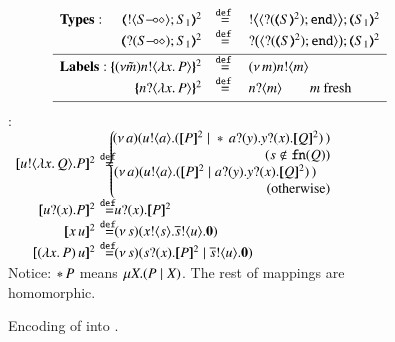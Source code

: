 \begin{figure}[t]
\[
\begin{array}{l}
	\begin{array}{rcl}
\noindent{\bf Types:}\hspace{0.5cm} 
		\tmap{\btout{\lhot{S}}S_1}{2} & \defeq & \bbtout{\chtype{\btinp{\tmap{S}{2}}\tinact}}\tmap{S_1}{2} \\
		\tmap{\btinp{\lhot{S}}S_1}{2} & \defeq & \bbtinp{\chtype{\btinp{\tmap{S}{2}}\tinact}}\tmap{S_1}{2} 
\\[1mm]
\hline
\noindent{\bf Labels:}\ 
		\mapa{(\nu \tilde{m})\bactout{n}{\abs{ x}{P}} }^2  & \defeq & \news{m} \bactout{n}{m} \\
		\mapa{\bactinp{n}{\abs{ x}{P}} }^2 &  \defeq & \bactinp{n}{m}
\quad \quad m \text{ fresh}
\\[1mm]
\hline
\end{array}
\end{array}
\]
\hspace{4mm}{\bf Terms} :\\
\noi$
\begin{array}{rcll}
		\pmap{\bout{u}{\abs{x}{Q}} P}{2} &\!\!\!\! \defeq \!\!\!\!\!\!\!\!&\!\!\!  \left\{
		\begin{array}{r}
		\!\!\!\!	\newsp{a}{\bout{u}{a} (\pmap{P}{2} \Par \repl{} \binp{a}{y} \binp{y}{x} \pmap{Q}{2})\,}\\
                  (s \notin \fn{Q}) \\
		\!\!\!\!	\newsp{a}{\bout{u}{a} (\pmap{P}{2} \Par \binp{a}{y} \binp{y}{x} \pmap{Q}{2})\,}\quad\\
            \textrm{(otherwise)} %
		\end{array}
		\right.
		\\
\pmap{\binp{u}{x} P}{2} &\!\!\!\! \defeq \!\!\!\! \!\!\!\! &  \binp{u}{x} \pmap{P}{2}
\\
\pmap{\appl{x}{u}}{2} & \!\!\!\! \defeq \!\!\!\! \!\!\!\! & \newsp{s}{\bout{x}{s} \bout{\dual{s}}{u} \inact} \\
\pmap{\appl{(\abs{x}{P})}{u}}{2} & \!\!\!\! \defeq \!\!\!\! \!\!\!\! & %
\newsp{s}{\binp{s}{x} \pmap{P}{2} \Par \bout{\dual{s}}{u} \inact}
	\end{array}
$\\[3mm]
{\small Notice: $\ast\,{} P$ means $\mu X. (P \;|\; X)$.
The rest of mappings are homomorphic.}\\ 
	\caption{
Encoding of \HOp into \sessp.
\label{f:enc:ho_to_sessp}
}
\Hlinefig
\end{figure}

